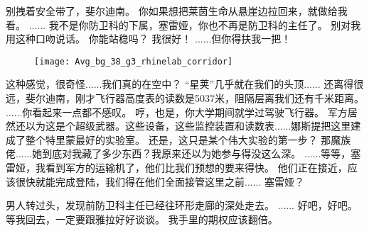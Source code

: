 \documentclass[openany]{book}
\begin{document}
\begin{dialogue}
     别拽着安全带了，斐尔迪南。
     你如果想把莱茵生命从悬崖边拉回来，就做给我看。
     ......
     我不是你防卫科的下属，塞雷娅，你也不再是防卫科的主任了。
     别对我用这种口吻说话。
     你能站稳吗？
     我很好！
     ......但你得扶我一把！
    \begin{figure}[h]
        \centering
        \texttt{[image: Avg\_bg\_38\_g3\_rhinelab\_corridor]}
    \end{figure}
     这种感觉，很奇怪......我们真的在空中？
     “星荚”几乎就在我们的头顶......
     还离得很远，斐尔迪南，刚才飞行器高度表的读数是5037米，阻隔层离我们还有千米距离。
     ......你看起来一点都不感叹。
     哼，也是，你大学期间就学过驾驶飞行器。
     军方居然还以为这是个超级武器。这些设备，这些监控装置和读数表......娜斯提把这里建成了整个特里蒙最好的实验室。
     还是，这只是某个伟大实验的第一步？
     那魔族佬......她到底对我藏了多少东西？我原来还以为她参与得没这么深。
     ......等等，塞雷娅，我看到军方的运输机了，他们比我们预想的要来得快。
     他们正在接近，应该很快就能完成登陆，我们得在他们全面接管这里之前......
     塞雷娅？\par
    男人转过头，发现前防卫科主任已经往环形走廊的深处走去。
     ......
     好吧，好吧。
     等我回去，一定要跟雅拉好好谈谈。
     我手里的期权应该翻倍。
\end{dialogue}
\end{document}
